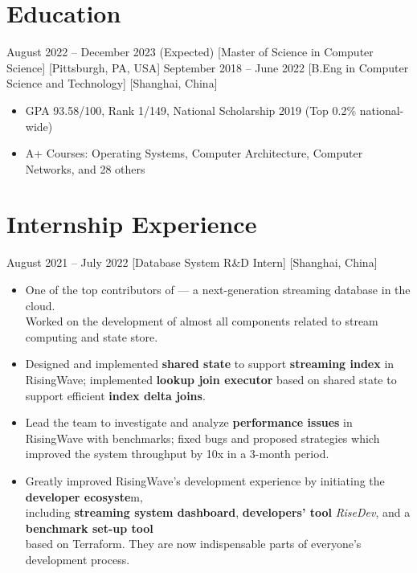 \documentclass{chicv}
\begin{document}
\begin{basicinfo}
\end{basicinfo}

\section{Education}
  {August 2022 -- December 2023 (Expected)}
  [Master of Science in Computer Science]
  [Pittsburgh, PA, USA]
  {September 2018 -- June 2022}
  [B.Eng in Computer Science and Technology]
  [Shanghai, China]
  \begin{itemize}
    \item GPA 93.58/100, Rank 1/149, National Scholarship 2019 (Top 0.2\% national-wide)
    \item A+ Courses: Operating Systems, Computer Architecture, Computer Networks, and 28 others
  \end{itemize}

\section{Internship Experience}

  {August 2021 – July 2022}
  [Database System R\&D Intern]
  [Shanghai, China]

\begin{itemize}
  \item One of the top contributors of  — a next-generation streaming database in the cloud. \\ Worked on the development of almost all components related to stream computing and state store.
  \item Designed and implemented \textbf{shared state} to support \textbf{streaming index} in RisingWave; implemented \textbf{lookup join executor} based on shared state to support efficient \textbf{index delta joins}.
  \item Lead the team to investigate and analyze \textbf{performance issues} in RisingWave with benchmarks; fixed bugs and proposed strategies which improved the system throughput by 10x in a 3-month period.
  \item Greatly improved RisingWave’s development experience by initiating the \textbf{developer ecosyste}m, \\including \textbf{streaming system dashboard}, \textbf{developers’ tool} \textit{RiseDev}, and a \textbf{benchmark set-up tool} \\based on Terraform. They are now indispensable parts of everyone’s development process.
\end{itemize}
\end{document}
